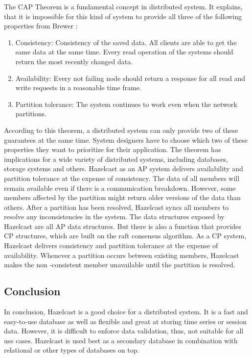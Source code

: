 The CAP Theorem is a fundamental concept in distributed system. It explains, that it is impossible for 
this kind of system to provide all three of the following properties from Brewer \parencite[S.~23]{Brewer.2012}:
\begin{enumerate}
    \item Consistency: Consistency of the saved data. All clients are able to get the same data at the same time. Every read operation of the systems should return the most recently changed data.
    \item Availability: Every not failing node should return a response for all read and write requests in a reasonable time frame.
    \item Partition tolerance: The system continues to work even when the network partitions.
\end{enumerate}

\noindent
According to this theorem, a distributed system can only provide two of these guarantees at the same 
time. System designers have to choose which two of these properties they want to prioritize for their 
application. The theorem has implications for a wide variety of distributed systems, including databases, 
storage systems and others. \parencite[S.~1]{Brewer.2017}
Hazelcast as an AP system delivers availability and partition tolerance at the expense of consistency. 
The data of all members will remain available even if there is a communication breakdown. 
However, some members affected by the partition might return older versions of the data than others. 
After a partition has been resolved, Hazelcast syncs all members to resolve any inconsistencies in the 
system. The data structures exposed by Hazelcast are all AP data structures. 
But there is also a function  that provides CP structures, which are built on the raft consensus algorithm. 
As a CP system, Hazelcast  delivers consistency and partition tolerance at the expense of availability. 
Whenever a partition occurs between existing members, Hazelcast makes the non -consistent member 
unavailable until the partition is resolved. \parencite{Hazelcast.05.04.2023}

\subsection{Conclusion} \label{subsec:conclusionHazelcast}

In conclusion, Hazelcast is a good choice for a distributed system. It is a fast and easy-to-use database as well as
flexible and great at storing time series or session data. However, it is difficult to enforce data validation, thus, 
not suitable for all use cases. Hazelcast is used best as a secondary database in combination with relational or other types of databases on top.


